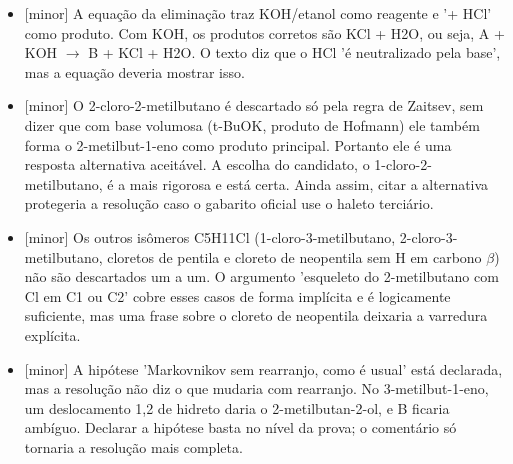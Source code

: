 \documentclass{article}%
\begin{document}
\begin{itemize}%
\item%
{[}minor{]} A equação da eliminação traz KOH/etanol como reagente e '+ HCl' como produto. Com KOH, os produtos corretos são KCl + H2O, ou seja, A + KOH $\to$ B + KCl + H2O. O texto diz que o HCl 'é neutralizado pela base', mas a equação deveria mostrar isso.%
\item%
{[}minor{]} O 2{-}cloro{-}2{-}metilbutano é descartado só pela regra de Zaitsev, sem dizer que com base volumosa (t{-}BuOK, produto de Hofmann) ele também forma o 2{-}metilbut{-}1{-}eno como produto principal. Portanto ele é uma resposta alternativa aceitável. A escolha do candidato, o 1{-}cloro{-}2{-}metilbutano, é a mais rigorosa e está certa. Ainda assim, citar a alternativa protegeria a resolução caso o gabarito oficial use o haleto terciário.%
\item%
{[}minor{]} Os outros isômeros C5H11Cl (1{-}cloro{-}3{-}metilbutano, 2{-}cloro{-}3{-}metilbutano, cloretos de pentila e cloreto de neopentila sem H em carbono $\beta$) não são descartados um a um. O argumento 'esqueleto do 2{-}metilbutano com Cl em C1 ou C2' cobre esses casos de forma implícita e é logicamente suficiente, mas uma frase sobre o cloreto de neopentila deixaria a varredura explícita.%
\item%
{[}minor{]} A hipótese 'Markovnikov sem rearranjo, como é usual' está declarada, mas a resolução não diz o que mudaria com rearranjo. No 3{-}metilbut{-}1{-}eno, um deslocamento 1,2 de hidreto daria o 2{-}metilbutan{-}2{-}ol, e B ficaria ambíguo. Declarar a hipótese basta no nível da prova; o comentário só tornaria a resolução mais completa.%
\end{itemize}%
\end{document}
